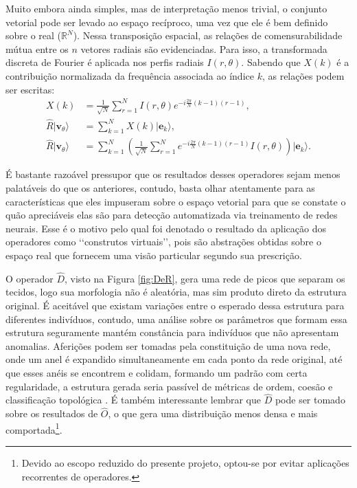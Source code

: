 \documentclass[a4paper, 12pt]{report}
\begin{document}
Muito embora ainda simples, mas de interpretação menos trivial, o conjunto vetorial pode ser levado ao espaço recíproco, uma vez que ele é bem definido sobre o real ($\mathbb{R}^N$). Nessa transposição espacial, as relações de comensurabilidade mútua entre os $n$ vetores radiais são evidenciadas. Para isso, a transformada discreta de Fourier é aplicada nos perfis radiais $ I(r, \theta)$. Sabendo que $X(k)$ é a contribuição normalizada da frequência associada ao índice $k$, as relações podem ser escritas:
\begin{align}
	X(k) &= \frac{1}{\sqrt{N}} \sum_{r=1}^N I(r, \theta) e^{-i \frac{2\pi}{N} (k-1)(r-1)}, \\
	\hat{R} | \mathbf{v}_\theta \rangle &= \sum_{k=1}^N X(k) | \mathbf{e}_k \rangle, \\
	\hat{R} | \mathbf{v}_\theta \rangle &= \sum_{k=1}^N \left( \frac{1}{\sqrt{N}} \sum_{r=1}^N e^{-i \frac{2\pi}{N} (k-1)(r-1)} I(r, \theta) \right) | \mathbf{e}_k \rangle.
	\label{eq:R}
\end{align}

É bastante razoável pressupor que os resultados desses operadores sejam menos palatáveis do que os anteriores, contudo, basta olhar atentamente para as características que eles impuseram sobre o espaço vetorial para que se constate o quão apreciáveis elas são para detecção automatizada via treinamento de redes neurais. Esse é o motivo pelo qual foi denotado o resultado da aplicação dos operadores como {\lq\lq}construtos virtuais{\rq\rq}, pois são abstrações obtidas sobre o espaço real que fornecem uma visão particular segundo sua prescrição.   

O operador $\hat{D}$, visto na Figura \ref{fig:DeR}, gera uma rede de picos que separam os tecidos, logo sua morfologia não é aleatória, mas sim produto direto da estrutura original. É aceitável que existam variações entre o esperado dessa estrutura para diferentes indivíduos, contudo, uma análise sobre os parâmetros que formam essa estrutura seguramente mantém constância para indivíduos que não apresentam anomalias. Aferições podem ser tomadas pela constituição de uma nova rede, onde um anel é expandido simultaneamente em cada ponto da rede original, até que esses anéis se encontrem e colidam, formando um padrão com certa regularidade, a estrutura gerada seria passível de métricas de ordem, coesão e classificação topológica \cite{Kittel1965}. É também interessante lembrar que $\hat{D}$ pode ser tomado sobre os resultados de $\hat{O}$, o que gera uma distribuição menos densa e mais comportada\footnote{Devido ao escopo reduzido do presente projeto, optou-se por evitar aplicações recorrentes de operadores.}.
\end{document}
